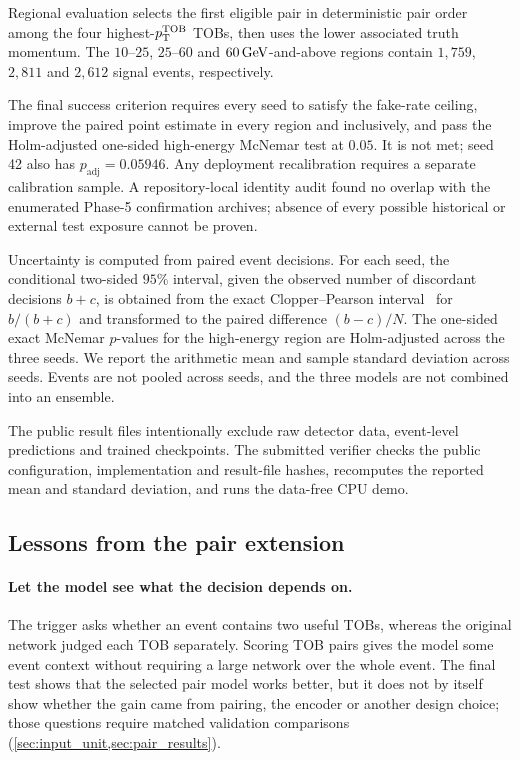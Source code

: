 Regional evaluation selects the first eligible pair in deterministic pair
order among the four highest-$p_{\mathrm{T}}^{\mathrm{TOB}}$ TOBs, then uses the lower associated
truth momentum. The $10$--$25$, $25$--$60$ and $60\,\mathrm{GeV}$-and-above regions
contain $1{,}759$, $2{,}811$ and $2{,}612$ signal events, respectively.

The final success criterion requires every seed to satisfy the fake-rate
ceiling, improve the paired point estimate in every region and inclusively,
and pass the Holm-adjusted one-sided high-energy McNemar test at $0.05$.
It is not met; seed 42 also has $p_{\mathrm{adj}}=0.05946$. Any deployment
recalibration requires a separate calibration sample. A repository-local
identity audit found no overlap with the enumerated Phase-5 confirmation
archives; absence of every possible historical or external test exposure
cannot be proven.

Uncertainty is computed from paired event decisions. For each seed, the
conditional two-sided $95\%$ interval, given the observed number of
discordant decisions $b+c$, is obtained from the exact Clopper--Pearson
interval~\cite{clopper1934} for $b/(b+c)$ and transformed to the paired
difference $(b-c)/N$. The one-sided exact McNemar $p$-values for the
high-energy region are Holm-adjusted across the three seeds. We report the
arithmetic mean and sample standard deviation across seeds. Events are not
pooled across seeds, and the three models are not combined into an ensemble.

The public result files intentionally exclude raw detector data, event-level
predictions and trained checkpoints. The submitted verifier checks the public
configuration, implementation and result-file hashes, recomputes the reported
mean and standard deviation, and runs the data-free CPU demo.

\subsection{Lessons from the pair extension}
\paragraph{Let the model see what the decision depends on.}
The trigger asks whether an event contains two useful TOBs, whereas the
original network judged each TOB separately. Scoring TOB pairs gives the model
some event context without requiring a large network over the whole event. The
final test shows that the selected pair model works better, but it does not by
itself show whether the gain came from pairing, the encoder or another design
choice; those questions require matched validation comparisons
(\cref{sec:input_unit,sec:pair_results}).

